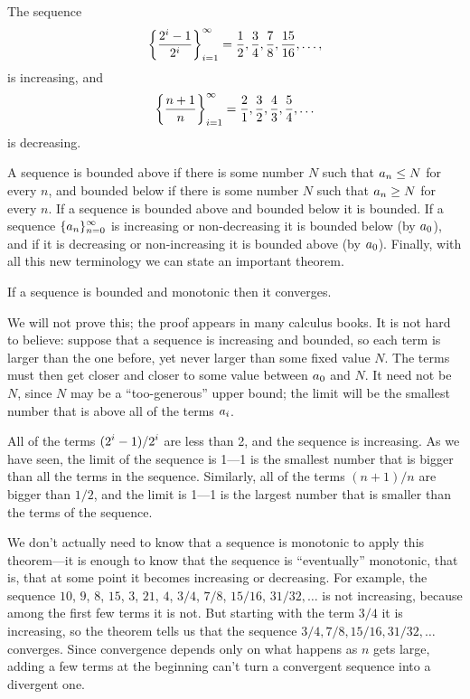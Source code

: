 \example
The sequence
$$
  \left\{{2^i-1\over2^i}\right\}_{i=1}^\infty=
  {1\over2},{3\over4},{7\over8},{15\over16},\ldots,
$$
is increasing, and
$$ 
  \left\{{n+1\over n}\right\}_{i=1}^\infty=
  {2\over1},{3\over2},{4\over3},{5\over4},\ldots
$$
is decreasing.
\endexample

A sequence is {\dfont bounded above\/}
if there is some number $N$ such that $\displaystyle a_n\le N$ for every $n$,
and {\dfont bounded below\/} if there is
some number $N$ such that $\displaystyle a_n\ge N$ for every $n$. If a sequence
is bounded above and bounded below it is {\dfont
bounded\/}. If a sequence $\displaystyle
\{a_n\}_{n=0}^\infty$ is increasing or non-decreasing it is bounded
below (by $\displaystyle a_0$), and if it is decreasing or non-increasing it is
bounded above (by $\displaystyle a_0$).  Finally, with all this new terminology
we can state an important theorem.

\thm If a sequence is bounded and monotonic then it converges.
\endthmnoproof

We will not prove this; the proof appears in many calculus books. It
is not hard to believe: suppose that a sequence is increasing and
bounded, so each term is larger than the one before, yet never larger
than some fixed value $N$. The terms must then get closer and closer
to some value between $\displaystyle a_0$ and $N$. It need not be $N$, since $N$ may
be a ``too-generous'' upper bound; the limit will be the
smallest number that is above all of the terms $\displaystyle a_i$.

\example
All of the terms $\displaystyle (2^i-1)/2^i$ are less than 2, and the sequence is
increasing. As we have seen, the limit of the sequence is 1---1 is the
smallest number that is bigger than all the terms in the sequence.
Similarly, all of the terms $(n+1)/n$ are bigger than $1/2$, and the
limit is 1---1 is the largest number that is smaller than the terms of
the sequence.
\endexample

We don't actually need to know that a sequence is monotonic to apply
this theorem---it is enough to know that the sequence is
``eventually'' monotonic, that is, that at some point it becomes
increasing or decreasing. For example, the sequence $10$, $9$, $8$,
$15$, $3$, $21$, $4$, $3/4$, $7/8$, $15/16$, $31/32,\ldots$ is not
increasing, because among the first few terms it is not. But starting
with the term $3/4$ it is increasing, so the theorem tells us that the
sequence $3/4, 7/8, 15/16, 31/32,\ldots$ converges.  Since convergence
depends only on what happens as $n$ gets large, adding a few
terms at the beginning can't turn a convergent sequence into a
divergent one.

